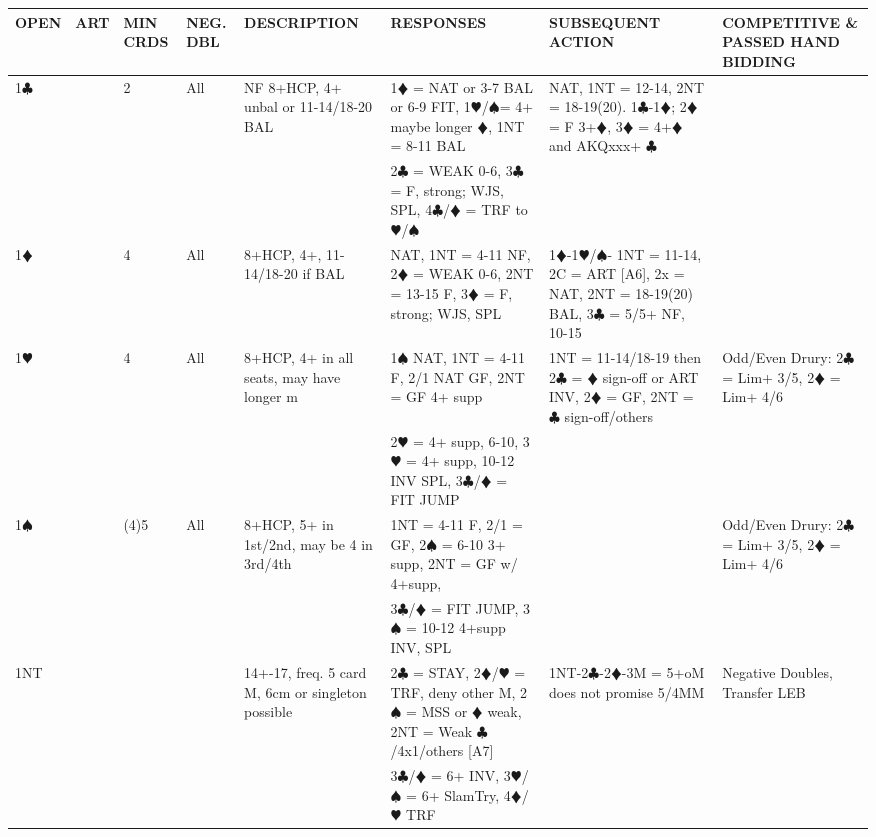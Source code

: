 \documentclass{article}
\newcommand\C{\ensuremath{\clubsuit}}
\newcommand\D{\color{red}\ensuremath{\vardiamondsuit}}
\renewcommand\H{\color{red}\ensuremath{\varheartsuit}}
\renewcommand\S{\ensuremath{\spadesuit}}
\newcommand\N{{\footnotesize NT}}
\begin{document}
\noindent
\begin{tabular}{| p{9mm} | p{6mm} | p{6mm} | p{6mm} | p{58mm} | p{62mm} | p{58mm} | p{48mm} |}
	\hline
	\cellcolor{green!25} \textbf{OPEN} & \cellcolor{green!25} \textbf{ART} & \cellcolor{green!25} \textbf{MIN CRDS} & \cellcolor{green!25} \textbf{NEG. DBL} & \cellcolor{green!25} \textbf{DESCRIPTION} & \cellcolor{green!25} \textbf{RESPONSES} & \cellcolor{green!25} \textbf{SUBSEQUENT ACTION} & \cellcolor{green!25} \textbf{COMPETITIVE \& PASSED HAND BIDDING} \\ \hline
	1\C & & 2 & All
			& NF 8+HCP, 4+ unbal or 11-14/18-20 BAL
			& 1{\D} = NAT or 3-7 BAL or 6-9 FIT, 1{\H}/{\S}= 4+ maybe longer {\D}, 1NT = 8-11 BAL 
			& NAT, 1NT = 12-14, 2NT = 18-19(20). 1{\C}-1{\D}; 2{\D} = F 3+{\D}, 3{\D} = 4+{\D} and AKQxxx+ {\C}
			& \\ \hline
	& & & & & 2{\C} = WEAK 0-6, 3{\C} = F, strong; WJS, SPL, 4{\C}/{\D} = TRF to {\H}/{\S}& & \\ \hline
	1\D & & 4 & All 
			& 8+HCP, 4+, 11-14/18-20 if BAL 
			& NAT, 1NT = 4-11 NF, 2{\D} = WEAK 0-6, 2{\N} = 13-15 F, 3{\D} = F, strong; WJS, SPL
			& 1{\D}-1{\H}/{\S}- 1NT = 11-14, 2C = ART [A6], 2x = NAT, 2NT = 18-19(20) BAL, 3{\C} = 5/5+ NF, 10-15 & \\ \hline
	1\H & & 4 & All 
			& 8+HCP, 4+ in all seats, may have longer m
			& 1{\S} NAT, 1NT = 4-11 F, 2/1 NAT GF, 2NT = GF 4+ supp 
			& 1NT = 11-14/18-19 then 2{\C} = {\D} sign-off or ART INV, 2{\D} = GF, 2NT = {\C} sign-off/others
			& Odd/Even Drury: 2{\C} = Lim+ 3/5, 2{\D} = Lim+ 4/6\\ \hline
	& & & & & 2{\H} = 4+ supp, 6-10, 3{\H} = 4+ supp, 10-12 INV 
			SPL, 3{\C}/{\D} = FIT JUMP& & \\ \hline
	1\S & & (4)5 & All 
			& 8+HCP, 5+ in 1st/2nd, may be 4 in 3rd/4th 
			& 1NT = 4-11 F, 2/1 = GF, 2{\S} = 6-10 3+ supp,
			2NT = GF w/ 4+supp,
			& 
			& Odd/Even Drury: 2{\C} = Lim+ 3/5, 2{\D} = Lim+ 4/6\\ \hline
	& & & & &  3{\C}/{\D} = FIT JUMP, 3{\S} = 10-12 4+supp INV, SPL& & \\ \hline
	1\N & & & & 14+-17, freq. 5 card M, 6cm or singleton possible 
			& 2{\C} = STAY, 2{\D}/{\H} = TRF, deny other M, 2{\S} = MSS or {\D} weak, 2{\N} = Weak {\C}/4x1/others [A7]
			& 1{\N}-2{\C}-2{\D}-3M = 5+oM does not promise 5/4MM
			& Negative Doubles, Transfer LEB\\ \hline
	& & & & & 3{\C}/{\D} = 6+ INV, 3{\H}/{\S} = 6+ SlamTry, 4{\D}/{\H} TRF

\end{tabular}
\end{document}
